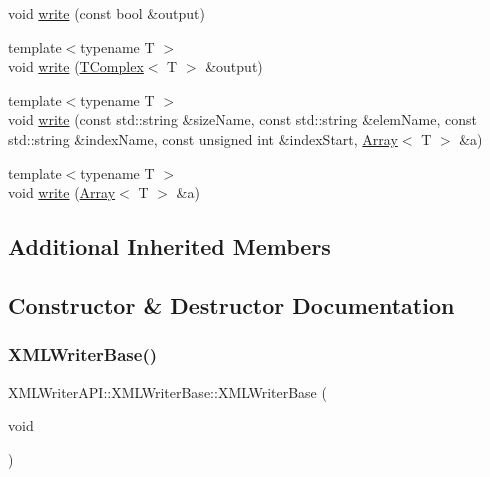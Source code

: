 \begin{DoxyCompactItemize}
\item 
void \mbox{\hyperlink{classXMLWriterAPI_1_1XMLWriterBase_ac9c7d2ed0127b4dd05b4b3c0225d9f34}{write}} (const bool \&output)
\item 
{\footnotesize template$<$typename T $>$ }\\void \mbox{\hyperlink{classXMLWriterAPI_1_1XMLWriterBase_a00b5edcaf39f8bdaf2aa5eed7118c8e7}{write}} (\mbox{\hyperlink{classXMLTComplex_1_1TComplex}{T\+Complex}}$<$ T $>$ \&output)
\item 
{\footnotesize template$<$typename T $>$ }\\void \mbox{\hyperlink{classXMLWriterAPI_1_1XMLWriterBase_a85d9236f5ec6ccc3c8559d4ec431bf6b}{write}} (const std\+::string \&size\+Name, const std\+::string \&elem\+Name, const std\+::string \&index\+Name, const unsigned int \&index\+Start, \mbox{\hyperlink{classXMLArray_1_1Array}{Array}}$<$ T $>$ \&a)
\item 
{\footnotesize template$<$typename T $>$ }\\void \mbox{\hyperlink{classXMLWriterAPI_1_1XMLWriterBase_a5475e21d716c65a21d620b4cde0c9ca1}{write}} (\mbox{\hyperlink{classXMLArray_1_1Array}{Array}}$<$ T $>$ \&a)
\end{DoxyCompactItemize}
\subsection*{Additional Inherited Members}


\subsection{Constructor \& Destructor Documentation}
\mbox{\label{classXMLWriterAPI_1_1XMLWriterBase_a1620cf7f4428110d2d77b4324293512e}} 
\subsubsection{\texorpdfstring{XMLWriterBase()}{XMLWriterBase()}\hspace{0.1cm}{\footnotesize\ttfamily [1/2]}}
{\footnotesize\ttfamily X\+M\+L\+Writer\+A\+P\+I\+::\+X\+M\+L\+Writer\+Base\+::\+X\+M\+L\+Writer\+Base (\begin{DoxyParamCaption}\item[{void}]{ }\end{DoxyParamCaption})\hspace{0.3cm}{\ttfamily [inline]}}

